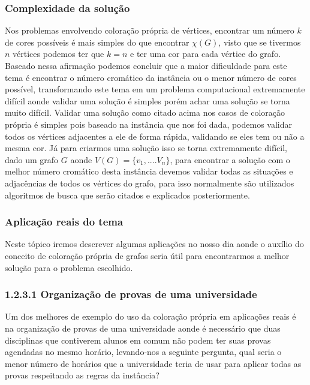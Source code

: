 \documentclass[12pt]{article}
\begin{document}
	
	\subsubsection{Complexidade da solução}
	
	Nos problemas envolvendo coloração própria de vértices, encontrar um número $k$ de cores possíveis é mais simples do que encontrar $\chi(G)$, visto que se tivermos $n$ vértices podemos ter que $k = n$ e ter uma cor para cada vértice do grafo. Baseado nessa afirmação podemos concluir que a maior dificuldade para este tema é encontrar o número cromático da instância ou o menor número de cores possível, transformando este tema em um problema computacional extremamente difícil aonde validar uma solução é simples porém achar uma solução se torna muito difícil.
	Validar uma solução como citado acima nos casos de coloração própria é simples pois baseado na instância que nos foi dada, podemos validar todos os vértices adjacentes a ele de forma rápida, validando se eles tem ou não a mesma cor. Já para criarmos uma solução isso se torna extremamente difícil, dado um grafo $G$ aonde $V(G) = \{v_{1}, .... V_{n} \}$, para encontrar a solução com o melhor número cromático desta instância devemos validar todas as situações e adjacências de todos os vértices do grafo, para isso normalmente são utilizados algoritmos de busca que serão citados e explicados posteriormente.
	
	\subsubsection{Aplicação reais do tema}
	
	Neste tópico iremos descrever algumas aplicações no nosso dia aonde o auxílio do conceito de coloração própria de grafos seria útil para encontrarmos a melhor solução para o problema escolhido.
	
	
	\subsubsection*{1.2.3.1 Organização de provas de uma universidade}
	
	Um dos melhores de exemplo do uso da coloração própria em aplicações reais é na organização de provas de uma universidade aonde é necessário que duas disciplinas que contiverem alunos em comum não podem ter suas provas agendadas no mesmo horário, levando-nos a seguinte pergunta, qual seria o menor número de horários que a universidade teria de usar para aplicar todas as provas respeitando as regras da instância?
	
\end{document}
